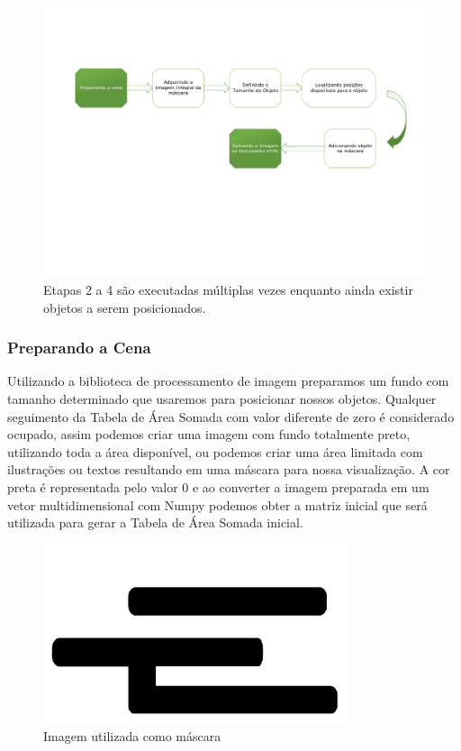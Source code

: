 \documentclass[12pt]{article}
\begin{document}
\begin{figure}[H]
\centering
\includegraphics[width=1\textwidth]{fluxo.pdf}
\caption{Etapas 2 a 4 são executadas múltiplas vezes enquanto ainda existir objetos a serem posicionados.}\label{company}
\end{figure}


\subsubsection{Preparando a Cena}

Utilizando a biblioteca de processamento de imagem preparamos um fundo com tamanho determinado que usaremos para posicionar nossos objetos. 
Qualquer seguimento da Tabela de Área Somada com valor diferente de zero é considerado ocupado, assim podemos criar uma imagem com fundo totalmente preto, utilizando toda a área disponível, ou podemos criar uma área limitada com ilustrações ou textos resultando em uma máscara para nossa visualização.
A cor preta é representada pelo valor 0 e ao converter a imagem preparada em um vetor multidimensional com Numpy podemos obter a matriz inicial que será utilizada para gerar a Tabela de Área Somada inicial.

\begin{figure}[H]
\centering
\includegraphics[width=0.8\textwidth]{e-comp-2450.pdf}
\caption{Imagem utilizada como máscara} \label{collaborator}
\end{figure}
\end{document}
